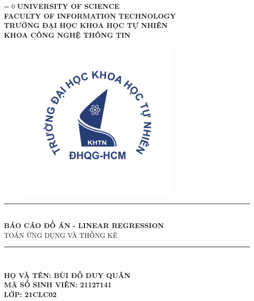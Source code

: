 \documentclass{report}
\def\lang{1} %
\begin{document}
\begin{titlepage}



\begin{center}
\ifnum\lang = 0
    \textbf{\Large UNIVERSITY OF SCIENCE}\\[0.2cm]
    \textbf{\Large FACULTY OF INFORMATION TECHNOLOGY}\\
\else
    \textbf{\Large TRƯỜNG ĐẠI HỌC KHOA HỌC TỰ NHIÊN}\\
    \textbf{\Large KHOA CÔNG NGHỆ THÔNG TIN}\\
\fi

\begin{figure}[!h]
    \centering
    \includegraphics[width=8cm, height=8cm]{assets/KHTN.png}
\end{figure}

\rule{\textwidth}{1pt} \\[0.4cm]
{\huge \bfseries BÁO CÁO ĐỒ ÁN - LINEAR REGRESSION}\\[0.4cm]
\textsc{\Large TOÁN ỨNG DỤNG VÀ THỐNG KÊ}
\rule{\textwidth}{1pt} \\[2cm]

\begin{center}
    \textbf{\Large HỌ VÀ TÊN: BÙI ĐỖ DUY QUÂN}\\[0.5cm]
    \textbf{\Large MÃ SỐ SINH VIÊN: 21127141}\\[0.5cm]
    \textbf{\Large LỚP: 21CLC02}\\[2cm]
\end{center}


\end{center}
\end{titlepage}
\end{document}
